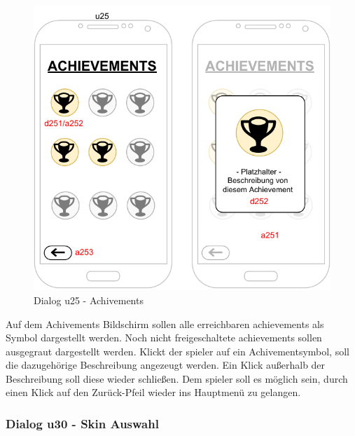 \begin{figure}[h!]
    \begin{center}
        \includegraphics{diagramme/pdf/Mockup-u25.pdf}
    \end{center}
    \caption{Dialog u25 - Achivements}
\end{figure}

Auf dem Achivements Bildschirm sollen alle erreichbaren \gls{achievements} als Symbol dargestellt werden. Noch nicht freigeschaltete \gls{achievements} sollen  ausgegraut dargestellt werden. Klickt der \gls{spieler} auf ein Achivementsymbol, soll die dazugehörige Beschreibung angezeugt werden. Ein Klick außerhalb der Beschreibung soll diese wieder schließen. Dem \gls{spieler} soll es möglich sein, durch einen Klick auf den Zurück-Pfeil wieder ins Hauptmenü zu gelangen.
\clearpage

\subsubsection{Dialog u30 - Skin Auswahl}

